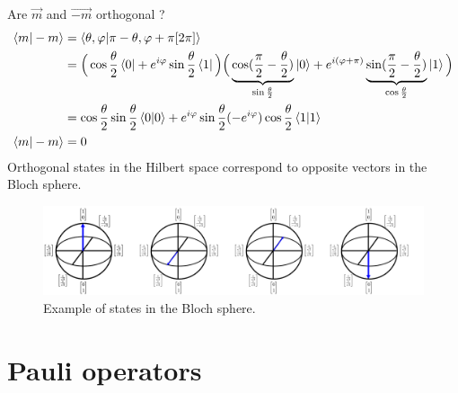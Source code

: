 \documentclass{article}
\begin{document}
Are $\vec{m}$ and $\vec{-m}$ orthogonal ?
\begin{equation}
    \label{m-m-orthogonal}
    \begin{aligned} %
        \braket{m|-m}
            & = \braket{\theta,\varphi|\pi-\theta,\varphi+\pi[2\pi]} \\
            & = \Big(\cos\frac{\theta}{2}\bra{0}+e^{i\varphi}\sin\frac{\theta}{2}\bra{1}\Big)
                \Big(\underbrace{\cos(\frac{\pi}{2}-\frac{\theta}{2})}_{\sin\frac{\theta}{2}}
                \ket{0}+e^{i(\varphi+\pi)}
                \underbrace{\sin(\frac{\pi}{2}-\frac{\theta}{2})}_{
                \cos\frac{\theta}{2}}\ket{1}\Big) \\
            & = \cos\frac{\theta}{2}\sin\frac{\theta}{2}\braket{0|0}
                +e^{i\varphi}\sin\frac{\theta}{2}(-e^{i\varphi})\cos\frac{\theta}{2}\braket{1|1} \\
        \braket{m|-m}
            & = 0
    \end{aligned}
\end{equation}
Orthogonal states in the Hilbert space correspond to opposite vectors in the
Bloch sphere.

\begin{figure}[h]
    \includegraphics[scale=0.3]{orthogonal-states-bloch-sphere.png}
    \caption{Example of states in the Bloch sphere.}
\end{figure}

\section{Pauli operators}
\end{document}
